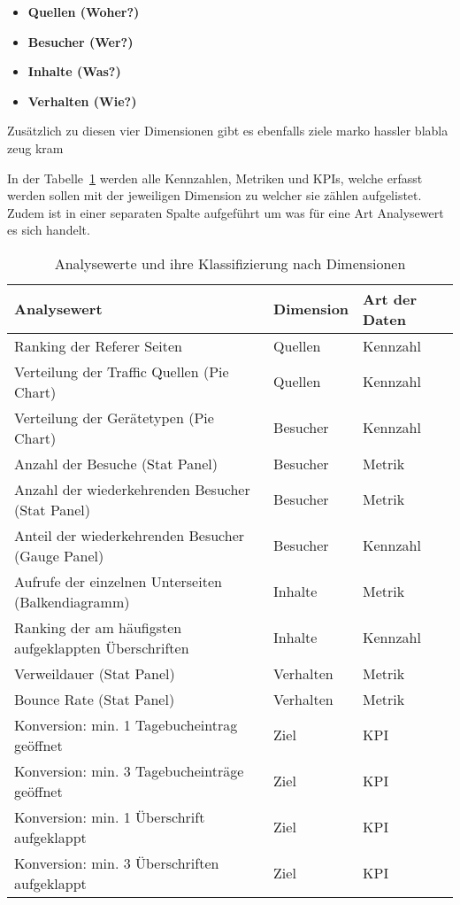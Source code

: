 \begin{itemize}
    \item \textbf{Quellen (Woher?)}  
    \item \textbf{Besucher (Wer?)}  
    \item \textbf{Inhalte (Was?)}  
    \item \textbf{Verhalten (Wie?)}  
\end{itemize}

Zusätzlich zu diesen vier Dimensionen gibt es ebenfalls ziele marko hassler blabla zeug kram

In der Tabelle~\ref{tab:analysewerte} werden alle Kennzahlen, Metriken und KPIs, welche erfasst werden sollen mit der jeweiligen Dimension zu welcher sie zählen aufgelistet. Zudem ist in einer separaten Spalte aufgeführt um was für eine Art Analysewert es sich handelt.

\begin{table}[H]
    \centering
    \begin{tabularx}{\textwidth}{l l l}
        \hline
        \textbf{Analysewert} & \textbf{Dimension} & \textbf{Art der Daten} \\
        \hline
        Ranking der Referer Seiten & Quellen & Kennzahl \\
        Verteilung der Traffic Quellen (Pie Chart) & Quellen & Kennzahl \\
        Verteilung der Gerätetypen (Pie Chart) & Besucher & Kennzahl \\
        Anzahl der Besuche (Stat Panel) & Besucher & Metrik \\
        Anzahl der wiederkehrenden Besucher (Stat Panel) & Besucher & Metrik \\
        Anteil der wiederkehrenden Besucher (Gauge Panel) & Besucher & Kennzahl \\
        Aufrufe der einzelnen Unterseiten (Balkendiagramm) & Inhalte & Metrik \\
        Ranking der am häufigsten aufgeklappten Überschriften & Inhalte & Kennzahl \\
        Verweildauer (Stat Panel) & Verhalten & Metrik \\
        Bounce Rate (Stat Panel) & Verhalten & Metrik \\
        Konversion: min. 1 Tagebucheintrag geöffnet & Ziel & KPI \\
        Konversion: min. 3 Tagebucheinträge geöffnet & Ziel & KPI \\
        Konversion: min. 1 Überschrift aufgeklappt & Ziel & KPI \\
        Konversion: min. 3 Überschriften aufgeklappt & Ziel & KPI \\
        \hline
    \end{tabularx}
    \caption{Analysewerte und ihre Klassifizierung nach Dimensionen}
    \label{tab:analysewerte}
\end{table}

